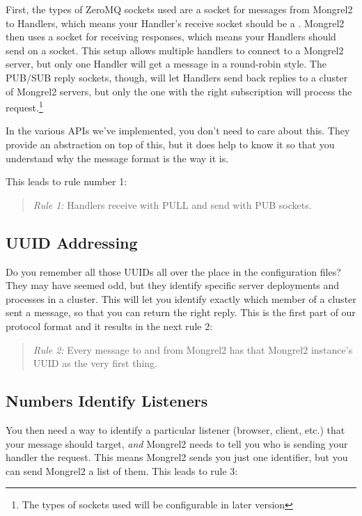 First, the types of ZeroMQ sockets used are a  socket
for messages from Mongrel2 to Handlers, which means your Handler's receive
socket should be a .  Mongrel2 then uses a
 socket for receiving responses, which means your Handlers
should send on a  socket.  This setup
allows multiple handlers to connect to a Mongrel2 server, but only
one Handler will get a message in a round-robin style.  The PUB/SUB reply
sockets, though, will let Handlers send back replies to a cluster of
Mongrel2 servers, but only the one with the right subscription will
process the request.\footnote{The types of sockets used will be configurable
in later version}

In the various APIs we've implemented, you don't need to care about this.
They provide an abstraction on top of this, but it does help to know it
so that you understand why the message format is the way it is.

This leads to rule number 1:

\begin{quote}
\emph{Rule 1:} Handlers receive with PULL and send with PUB sockets.
\end{quote}

\subsection{UUID Addressing}

Do you remember all those UUIDs all over the place in the configuration files?
They may have seemed odd, but they identify specific server deployments and
processes in a cluster.  This will let you identify exactly which member of a
cluster sent a message, so that you can return the right reply.  This is the
first part of our protocol format and it results in the next rule 2:

\begin{quote}
\emph{Rule 2:} Every message to and from Mongrel2 has that Mongrel2 instance's
UUID as the very first thing.
\end{quote}

\subsection{Numbers Identify Listeners}

You then need a way to identify a particular listener (browser, client, etc.)
that your message should target, \emph{and} Mongrel2 needs to tell you who is
sending your handler the request.  This means Mongrel2 sends you just one
identifier, but you can send Mongrel2 a list of them.  This leads to rule 3:

